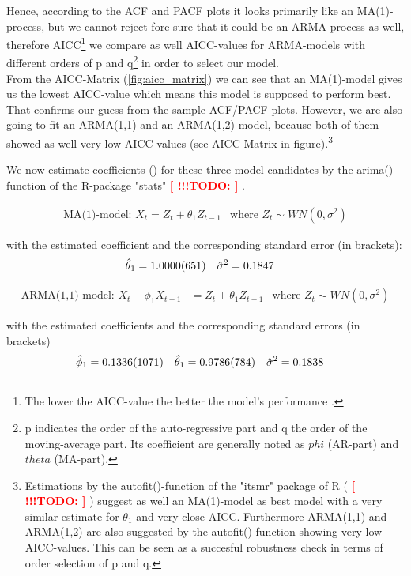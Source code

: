 \documentclass[11pt,a4paper]{article}
\newcommand{\TODO}[1]{%
    \textcolor{red}{ %
        \textbf{[ !!!TODO: #1 ]}%
    }%
    \PackageWarning{TODO:}{TODO: #1}%
}
\begin{document}
Hence, according to the ACF and PACF plots it looks primarily like an MA(1)-process, but we cannot reject fore sure that it could be an ARMA-process as well, therefore AICC\footnote{
    The lower the AICC-value the better the model's performance \citep{aic86}.
} we compare as well AICC-values for ARMA-models with different orders of p and q\footnote{
    p indicates the order of the auto-regressive part and q the order of the moving-average part.
    Its coefficient are generally noted as $phi$ (AR-part) and $theta$ (MA-part).} in order to select our model.\\
From the AICC-Matrix (\cref{fig:aicc_matrix}) we can see that an MA(1)-model gives us the lowest AICC-value which means this model is supposed to perform best. That confirms our guess from the sample ACF/PACF plots.
However, we are also going to fit an ARMA(1,1) and an ARMA(1,2) model, because both of them showed as well very low AICC-values (see AICC-Matrix in figure).\footnote{
    Estimations by the autofit()-function of the "itsmr" package of R (\TODO{}) suggest as well an MA(1)-model as best model with a very similar estimate for $\theta_1$ and very close AICC.
    Furthermore ARMA(1,1) and ARMA(1,2) are also suggested by the autofit()-function showing very low AICC-values.
    This can be seen as a succesful robustness check in terms of order selection of p and q.
}

We now estimate coefficients (\cite[p.~83]{bd02}) for these three model candidates   by the arima()-function of the R-package "stats" \TODO{}.


\begin{align*}
   \text{MA(1)-model: } X_t = Z_t + \theta_1 Z_{t-1}
    & \text{where ${Z_t} \sim WN(0,\sigma^2)$} 
\end{align*}

with the estimated coefficient and the corresponding standard error (in brackets):
%
%
\begin{align*}
    \hat{\theta}_1  &= \num{ 1.0000 \pm 0.0651}  &  \hat{\sigma}^2  &= \num{ 0.1847 }
\end{align*}


\begin{align*}
    \text{ARMA(1,1)-model: }X_t - \phi_1 X_{t-1} &= Z_t + \theta_1 Z_{t-1}
    & \text{where ${Z_t} \sim WN(0,\sigma^2)$} 
\end{align*}

with the estimated coefficients and the corresponding standard errors (in brackets)
%
%
\begin{align*}
    \hat{\phi}_1    &= \num{ 0.1336 \pm 0.1071}  &  \hat{\theta}_1  &= \num{ 0.9786 \pm 0.0784}  &  \hat{\sigma}^2  &= \num{ 0.1838 }
\end{align*}
\end{document}
